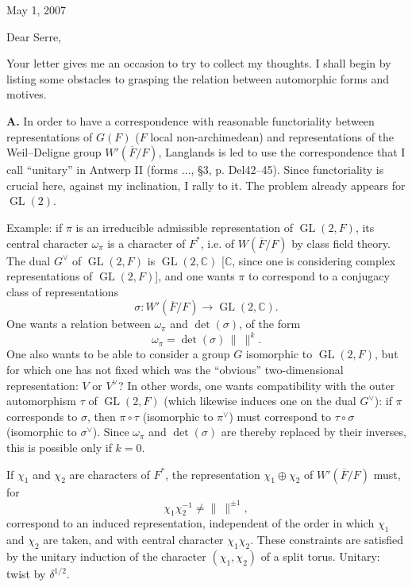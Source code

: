 \documentclass[11pt]{article}
\newcommand{\GL}{\operatorname{GL}}
\newcommand{\Fbar}{\overline F}
\newcommand{\normchar}{\|\ \|}
\begin{document}
\thispagestyle{empty}

\begin{flushright}
May 1, 2007
\end{flushright}

Dear Serre,

Your letter gives me an occasion to try to collect my thoughts. I shall begin by listing some obstacles to grasping the relation between automorphic forms and motives.

\textbf{A.} In order to have a correspondence with reasonable functoriality between representations of \(G(F)\) (\(F\) local non-archimedean) and representations of the Weil--Deligne group \(W'(\Fbar/F)\), Langlands is led to use the correspondence that I call ``unitary'' in Antwerp II (forms \(\ldots\), \S3, p. Del42--45). Since functoriality is crucial here, against my inclination, I rally to it. The problem already appears for \(\GL(2)\).

Example: if \(\pi\) is an irreducible admissible representation of \(\GL(2,F)\), its central character \(\omega_\pi\) is a character of \(F^\ast\), i.e. of \(W(\Fbar/F)\) by class field theory. The dual \(G^\vee\) of \(\GL(2,F)\) is \(\GL(2,\mathbb C)\) [\(\mathbb C\), since one is considering complex representations of \(\GL(2,F)\)], and one wants \(\pi\) to correspond to a conjugacy class of representations
\[
\sigma:W'(\Fbar/F)\longrightarrow \GL(2,\mathbb C).
\]
One wants a relation between \(\omega_\pi\) and \(\det(\sigma)\), of the form
\[
\omega_\pi=\det(\sigma)\,\normchar^k.
\]
One also wants to be able to consider a group \(G\) isomorphic to \(\GL(2,F)\), but for which one has not fixed which was the ``obvious'' two-dimensional representation: \(V\) or \(V^\vee\)? In other words, one wants compatibility with the outer automorphism \(\tau\) of \(\GL(2,F)\) (which likewise induces one on the dual \(G^\vee\)): if \(\pi\) corresponds to \(\sigma\), then \(\pi\circ\tau\) (isomorphic to \(\pi^\vee\)) must correspond to \(\tau\circ\sigma\) (isomorphic to \(\sigma^\vee\)). Since \(\omega_\pi\) and \(\det(\sigma)\) are thereby replaced by their inverses, this is possible only if \(k=0\).

If \(\chi_1\) and \(\chi_2\) are characters of \(F^\ast\), the representation \(\chi_1\oplus\chi_2\) of \(W'(\Fbar/F)\) must, for
\[
\chi_1\chi_2^{-1}\ne \normchar^{\pm1},
\]
correspond to an induced representation, independent of the order in which \(\chi_1\) and \(\chi_2\) are taken, and with central character \(\chi_1\chi_2\). These constraints are satisfied by the unitary induction of the character \((\chi_1,\chi_2)\) of a split torus. Unitary: twist by \(\delta^{1/2}\).
\end{document}
